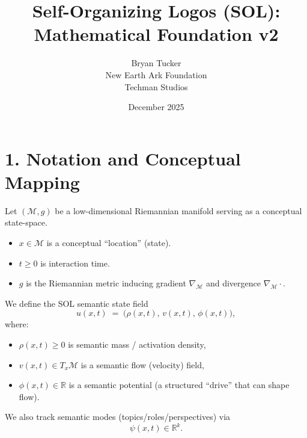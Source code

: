 \documentclass[11pt]{article}
\title{Self-Organizing Logos (SOL): Mathematical Foundation v2}
\author{Bryan Tucker\\
New Earth Ark Foundation\\
Techman Studios}
\date{December 2025}
\begin{document}
\maketitle

\section*{1. Notation and Conceptual Mapping}

Let $(\mathcal{M}, g)$ be a low-dimensional Riemannian manifold serving as a conceptual state-space.
\begin{itemize}
  \item $x \in \mathcal{M}$ is a conceptual ``location'' (state).
  \item $t \ge 0$ is interaction time.
  \item $g$ is the Riemannian metric inducing gradient $\nabla_{\mathcal{M}}$ and divergence $\nabla_{\mathcal{M}}\cdot$.
\end{itemize}

We define the SOL semantic state field
\begin{equation}
u(x,t) \;=\; \big(\rho(x,t),\, v(x,t),\, \phi(x,t)\big),
\end{equation}
where:
\begin{itemize}
  \item $\rho(x,t)\ge 0$ is semantic mass / activation density,
  \item $v(x,t)\in T_x\mathcal{M}$ is a semantic flow (velocity) field,
  \item $\phi(x,t)\in\mathbb{R}$ is a semantic potential (a structured ``drive'' that can shape flow).
\end{itemize}

We also track semantic modes (topics/roles/perspectives) via
\begin{equation}
\psi(x,t)\in\mathbb{R}^k.
\end{equation}
\end{document}

